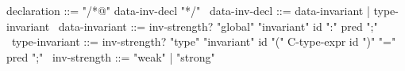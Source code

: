 \begin{syntax}
  declaration ::= "/*@" data-inv-decl "*/"
  \
  data-inv-decl ::= data-invariant | type-invariant
  \
  data-invariant ::= {inv-strength?} "global" "invariant" id ":" pred ";"
  \
  type-invariant ::= {inv-strength?} "type" "invariant" id "(" C-type-expr id ")" "=" pred ";"
  \
  {inv-strength} ::= { "weak" } | { "strong" }
\end{syntax}